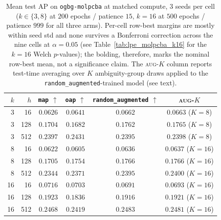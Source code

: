 \begin{table}[h]
\centering
\caption{Mean test AP on \texttt{ogbg-molpcba} at matched compute,
$3$ seeds per cell ($k\!\in\!\{3,8\}$ at $200$ epochs / patience $15$,
$k\!=\!16$ at $500$ epochs / patience $999$ for all three arms).
Per-cell row-best margins are mostly within seed std and none survives
a Bonferroni correction across the nine cells at $\alpha\!=\!0.05$
(see Table~\ref{tab:lpe_molpcba_k16} for the $k\!=\!16$ Welch
$p$-values); the bolding, therefore, marks the nominal row-best mean,
not a significance claim. The \textsc{aug-$K$} column reports
test-time averaging over $K$ ambiguity-group draws applied to the
\texttt{random\_augmented}-trained model (see text).}
\label{tab:lpe_molpcba_main}
\begin{tabular}{rrcccc}
\toprule
$k$  &  $h$  & \texttt{map} $\uparrow$ & \texttt{oap} $\uparrow$ & \texttt{random\_augmented} $\uparrow$ & \textsc{aug-$K$} \\
\midrule
 3   &   16  & $0.0626$        & $0.0641$        & $\mathbf{0.0662}$           & $0.0663$ ($K\!=\!8$)  \\
 3   &  128  & $0.1704$        & $0.1682$        & $\mathbf{0.1762}$           & $0.1765$ ($K\!=\!8$)  \\
 3   &  512  & $0.2397$        & $\mathbf{0.2431}$ & $0.2395$                  & $0.2398$ ($K\!=\!8$)  \\
\midrule
 8   &   16  & $0.0622$        & $0.0605$        & $\mathbf{0.0636}$           & $0.0637$ ($K\!=\!16$) \\
 8   &  128  & $0.1705$        & $0.1754$        & $\mathbf{0.1766}$           & $0.1766$ ($K\!=\!16$) \\
 8   &  512  & $0.2344$        & $0.2371$        & $\mathbf{0.2395}$           & $0.2400$ ($K\!=\!16$) \\
\midrule
16   &   16  & $\mathbf{0.0716}$ & $0.0703$      & $0.0691$                    & $0.0693$ ($K\!=\!16$) \\
16   &  128  & $\mathbf{0.1923}$ & $0.1836$      & $0.1916$                    & $0.1921$ ($K\!=\!16$) \\
16   &  512  & $0.2468$        & $0.2419$        & $\mathbf{0.2483}$           & $0.2481$ ($K\!=\!16$) \\
\bottomrule
\end{tabular}
\end{table}

